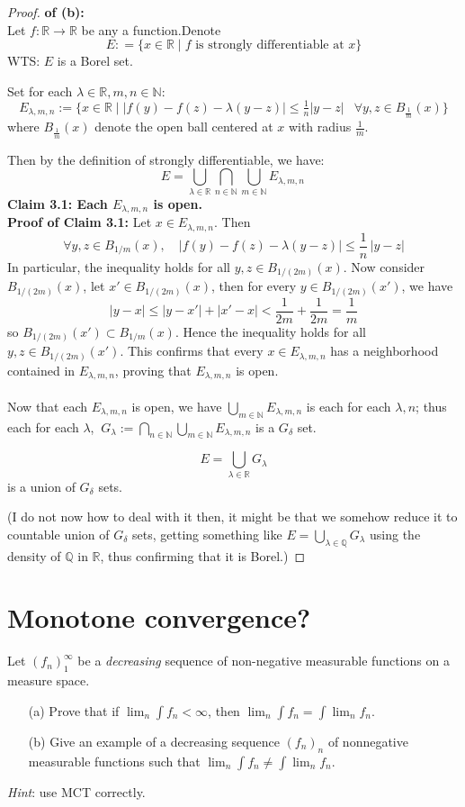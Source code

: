 \documentclass[lang=cn,11pt]{elegantbook}
\begin{document}
\begin{proof}
   \textbf{ of (b):}\\
Let $f\colon\mathbb{R}\to\mathbb{R}$ be any a function.Denote \[ E: = \{x\in \mathbb{R}\mid f \text{ is strongly differentiable at } x\}\]
WTS: $E$ is a Borel set.

Set for each $\lambda \in \mathbb{R}, m,n\in\mathbb{N}$: \[ E_{\lambda,m,n}:=\{x\in \mathbb{R} \mid |f(y)-f(z)-\lambda(y-z)|\le\tfrac1n|y-z|\   \;\; \forall y,z \in B_{\frac{1}{m}}(x)\}\]
where $ B_{\frac{1}{m}}(x)$ denote the open ball centered at $x$ with radius $\frac{1}{m}$.

Then by the definition of strongly differentiable, we have: \[
   E=\bigcup_{\lambda\in\mathbb{R}}\bigcap_{n\in\mathbb{N}}\bigcup_{m\in\mathbb{N}} E_{\lambda,m,n}\,
   \]
\noindent \textbf{Claim 3.1: Each $ E_{\lambda,m,n}$ is open.}\\
\textbf{Proof of Claim 3.1:} Let \(x\in E_{\lambda,m,n}\). Then
\[\forall y,z\in B_{1/m}(x),\quad \bigl|f(y)-f(z)-\lambda(y-z)\bigr|\le \frac1n\,|y -z|\]
In particular, the inequality holds for all \(y,z\in B_{1/(2m)}(x)\). Now consider $B_{1/(2m)}(x)$, let $x' \in B_{1/(2m)}(x)$, then for every \(y\in B_{1/(2m)}(x')\), we have \[
|y-x|\le |y-x'|+|x'-x|<\frac{1}{2m}+\frac{1}{2m}=\frac{1}{m} \]
so \(B_{1/(2m)}(x')\subset B_{1/m}(x)\). Hence the inequality holds for all \(y,z\in B_{1/(2m)}(x')\). This confirms that every \(x\in E_{\lambda,m,n}\) has a neighborhood contained in \(E_{\lambda,m,n}\), proving that \(E_{\lambda,m,n}\) is open.\\\\


Now that each $ E_{\lambda,m,n}$ is open, we have $\bigcup_{m\in\mathbb{N}} E_{\lambda,m,n}$ is each for each $\lambda , n$; thus each for each $\lambda$, \(\ G_\lambda := \bigcap_{n\in\mathbb{N}}\bigcup_{m\in\mathbb{N}} E_{\lambda,m,n}\) is a $G_\delta$ set.

\[E = \bigcup_{\lambda\in\mathbb{R}} G_\lambda \]
is a union of $G_\delta$ sets.

(I do not now how to deal with it then, it might be that we somehow reduce it to countable union of $G_\delta$ sets, getting something like $E = \bigcup_{\lambda\in\mathbb{Q}} G_\lambda $ using the density of $\mathbb{Q}$ in $\mathbb{R}$, thus confirming that it is Borel.)
\end{proof}


  
\section{Monotone convergence?}
  Let $(f_n)_1^\infty$ be a \emph{decreasing} sequence of non-negative measurable functions on a measure space. 
  \begin{itemize}
  \item[(a)]  Prove that if $\lim_n\int f_n<\infty$, then $\lim_n\int f_n=\int\lim_nf_n$. 
  \item[(b)]Give an example of a decreasing sequence $(f_n)_n$ of nonnegative measurable functions such that $\lim_n\int f_n\ne\int\lim_nf_n$. 
  \end{itemize}
  \textit{Hint}: use MCT correctly. 
\end{document}
